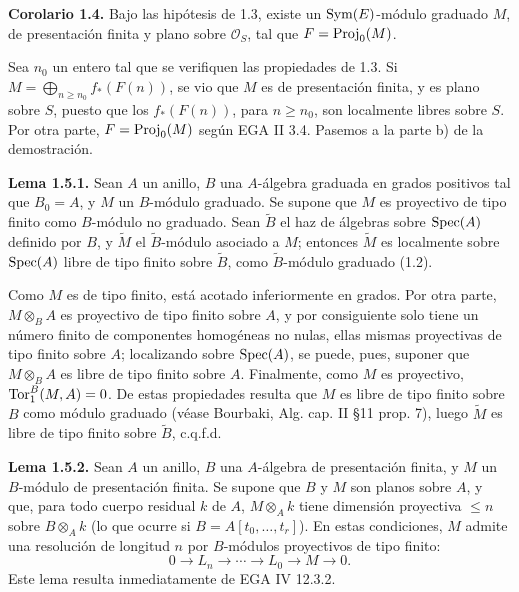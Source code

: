 \providecommand{\sisi}[2]{#2}

\textbf{Corolario 1.4.} Bajo las hipótesis de 1.3, existe un \(\operatorname{Sym}(E)\)-módulo graduado \(M\), de presentación finita y plano sobre \(\mathcal O_S\), tal que \(F=\operatorname{Proj}_0(M)\).

Sea \(n_0\) un entero tal que se verifiquen las propiedades de 1.3. Si \(M=\bigoplus_{n\geq n_0} f_*(F(n))\), se vio que \(M\) es de presentación finita, y es plano sobre \(S\), puesto que los \(f_*(F(n))\), para \(n\geq n_0\), son localmente libres sobre \(S\). Por otra parte, \(F=\operatorname{Proj}_0(M)\) según EGA II 3.4. Pasemos a la parte b) de la demostración.

\textbf{Lema 1.5.1.} Sean \(A\) un anillo, \(B\) una \(A\)-álgebra graduada en grados positivos tal que \(B_0=A\), y \(M\) un \(B\)-módulo graduado. Se supone que \(M\) es proyectivo de tipo finito como \(B\)-módulo no graduado. Sean \(\widetilde B\) el haz de álgebras sobre \(\operatorname{Spec}(A)\) definido por \(B\), y \(\widetilde M\) el \(\widetilde B\)-módulo asociado a \(M\); entonces \(\widetilde M\) es localmente sobre \(\operatorname{Spec}(A)\) libre de tipo finito sobre \(\widetilde B\), como \(\widetilde B\)-módulo graduado (1.2).

Como \(M\) es de tipo finito, está acotado inferiormente en grados. Por otra parte, \(M\otimes_B A\) es proyectivo de tipo finito sobre \(A\), y por consiguiente solo tiene un número finito de componentes homogéneas no nulas, ellas mismas proyectivas de tipo finito sobre \(A\); localizando sobre \(\operatorname{Spec}(A)\), se puede, pues, suponer que \(M\otimes_B A\) es libre de tipo finito sobre \(A\). Finalmente, como \(M\) es proyectivo, \(\operatorname{Tor}_1^B(M,A)=0\). De estas propiedades resulta que \(M\) es libre de tipo finito sobre \(B\) como módulo graduado (véase Bourbaki, Alg. cap. II §11 prop. 7), luego \(\widetilde M\) es libre de tipo finito sobre \(\widetilde B\), c.q.f.d.

\textbf{Lema 1.5.2.} Sean \(A\) un anillo, \(B\) una \(A\)-álgebra de presentación finita, y \(M\) un \(B\)-módulo de presentación finita. Se supone que \(B\) y \(M\) son planos sobre \(A\), y que, para todo cuerpo residual \(k\) de \(A\), \(M\otimes_A k\) tiene dimensión proyectiva \(\leq n\) sobre \(B\otimes_A k\) (lo que ocurre si \(B=A[t_0,\ldots,t_r]\)). En estas condiciones, \(M\) admite una resolución de longitud \(n\) por \(B\)-módulos proyectivos de tipo finito:
\[
  0\longrightarrow L_n\longrightarrow\cdots\longrightarrow L_0\longrightarrow M\longrightarrow 0.
\]
Este lema resulta inmediatamente de EGA IV 12.3.2.

